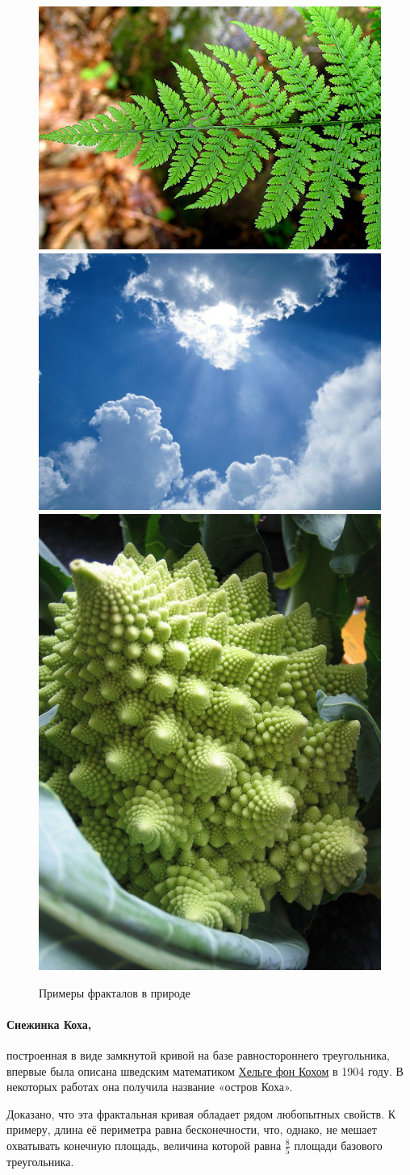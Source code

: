 \begin{figure}[ht]
    {\centering
        \includegraphics[height=0.26\textwidth]{images/fern.jpg}\hfil
        \includegraphics[height=0.26\textwidth]{images/clouds.jpg}\hfil
        \includegraphics[height=0.26\textwidth]{images/romanesco_broccoli.jpg}

    }
    \caption{Примеры фракталов в природе}
\end{figure}



\paragraph{Снежинка Коха,}
построенная в виде замкнутой кривой на базе равностороннего треугольника, впервые была описана шведским математиком \href{https://ru.wikipedia.org/wiki/Кох,_Нильс_Фабиан_Хельге_фон}{Хельге фон Кохом} в 1904 году. В некоторых работах она получила название «остров Коха».

Доказано, что эта фрактальная кривая обладает рядом любопытных свойств. К примеру, длина её периметра равна бесконечности, что, однако, не мешает охватывать конечную площадь, величина которой равна \(\frac{8}{5}\) площади базового треугольника.

